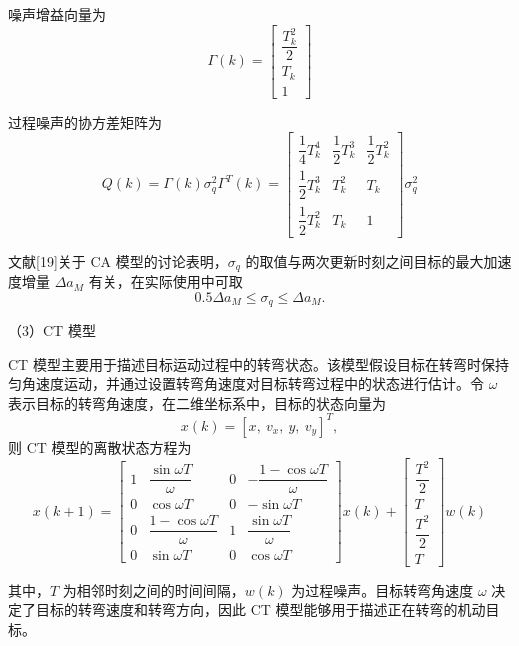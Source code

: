 \documentclass{xdupgthesis}
\begin{document}
噪声增益向量为
\begin{equation}
	\Gamma(k)=
	\begin{bmatrix}
		\dfrac{T_k^2}{2}\\
		T_k\\
		1
	\end{bmatrix}
\end{equation}

过程噪声的协方差矩阵为
\begin{equation}
	Q(k)=\Gamma(k)\sigma_q^2\Gamma^{T}(k)=
	\begin{bmatrix}
		\dfrac{1}{4}T_k^4 & \dfrac{1}{2}T_k^3 & \dfrac{1}{2}T_k^2\\[6pt]
		\dfrac{1}{2}T_k^3 & T_k^2 & T_k\\[6pt]
		\dfrac{1}{2}T_k^2 & T_k & 1
	\end{bmatrix}\sigma_q^2
\end{equation}

文献[19]关于 CA 模型的讨论表明，$\sigma_q$ 的取值与两次更新时刻之间目标的最大加速度增量 $\Delta a_M$ 有关，在实际使用中可取
\[
0.5\Delta a_M \leq \sigma_q \leq \Delta a_M.
\]

\textnormal{（3）CT 模型}\par\vspace{0.3\baselineskip}

CT 模型主要用于描述目标运动过程中的转弯状态。该模型假设目标在转弯时保持匀角速度运动，并通过设置转弯角速度对目标转弯过程中的状态进行估计。令 $\omega$ 表示目标的转弯角速度，在二维坐标系中，目标的状态向量为
\[
x(k)=[x,\ v_x,\ y,\ v_y]^T,
\]
则 CT 模型的离散状态方程为
\begin{equation}
	x(k+1)=
	\begin{bmatrix}
		1 & \dfrac{\sin \omega T}{\omega} & 0 & -\dfrac{1-\cos \omega T}{\omega}\\[8pt]
		0 & \cos \omega T & 0 & -\sin \omega T\\[6pt]
		0 & \dfrac{1-\cos \omega T}{\omega} & 1 & \dfrac{\sin \omega T}{\omega}\\[8pt]
		0 & \sin \omega T & 0 & \cos \omega T
	\end{bmatrix}
	x(k)
	+
	\begin{bmatrix}
		\dfrac{T^2}{2}\\
		T\\
		\dfrac{T^2}{2}\\
		T
	\end{bmatrix}
	w(k)
\end{equation}

其中，$T$ 为相邻时刻之间的时间间隔，$w(k)$ 为过程噪声。目标转弯角速度 $\omega$ 决定了目标的转弯速度和转弯方向，因此 CT 模型能够用于描述正在转弯的机动目标。
\end{document}

